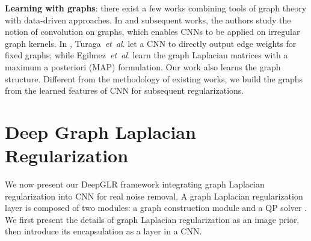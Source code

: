 \documentclass[10pt,twocolumn,letterpaper]{article}
\begin{document}
\textbf{Learning with graphs}:
there exist a few works combining tools of graph theory with data-driven approaches. 
In \cite{kipf2017semi,defferrard2016convolutional} and subsequent works, the authors study the notion of convolution on graphs, which enables CNNs to be applied on irregular graph kernels. 
In \cite{turaga2010convolutional}, Turaga~{\it et~al}. let a CNN to directly output edge weights for fixed graphs; while Egilmez~{\it et~al}. \cite{egilmez2017graph} learn the graph Laplacian matrices with a maximum a posteriori (MAP) formulation. 
Our work also learns the graph structure. 
Different from the methodology of existing works, we build the graphs from the learned features of CNN for subsequent regularizations. 


\section{Deep Graph Laplacian Regularization}\label{sec:glr}
%
We now present our DeepGLR framework integrating graph Laplacian regularization into CNN for real noise removal. 
A graph Laplacian regularization layer is composed of two modules: a graph construction module \cite{pang2017graph} and a QP solver \cite{amos2017optnet}. 
We first present the details of graph Laplacian regularization \cite{pang2017graph,elmoataz2008nonlocal,hu2016graph} as an image prior, then introduce its encapsulation as a layer in a CNN.
\end{document}
